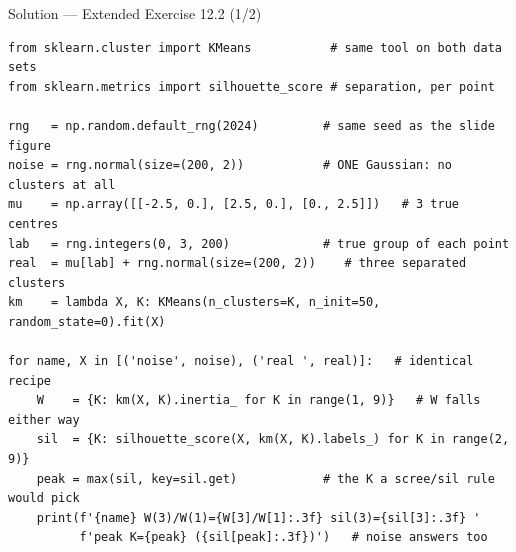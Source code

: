 \documentclass[aspectratio=169,11pt]{beamer}
\begin{document}
\begin{frame}[fragile]{Solution --- Extended Exercise 12.2 (1/2)}
\begin{solutionbox}
\begin{lstlisting}[basicstyle=\ttfamily\scriptsize]
from sklearn.cluster import KMeans           # same tool on both data sets
from sklearn.metrics import silhouette_score # separation, per point

rng   = np.random.default_rng(2024)         # same seed as the slide figure
noise = rng.normal(size=(200, 2))           # ONE Gaussian: no clusters at all
mu    = np.array([[-2.5, 0.], [2.5, 0.], [0., 2.5]])   # 3 true centres
lab   = rng.integers(0, 3, 200)             # true group of each point
real  = mu[lab] + rng.normal(size=(200, 2))    # three separated clusters
km    = lambda X, K: KMeans(n_clusters=K, n_init=50, random_state=0).fit(X)

for name, X in [('noise', noise), ('real ', real)]:   # identical recipe
    W    = {K: km(X, K).inertia_ for K in range(1, 9)}   # W falls either way
    sil  = {K: silhouette_score(X, km(X, K).labels_) for K in range(2, 9)}
    peak = max(sil, key=sil.get)            # the K a scree/sil rule would pick
    print(f'{name} W(3)/W(1)={W[3]/W[1]:.3f} sil(3)={sil[3]:.3f} '
          f'peak K={peak} ({sil[peak]:.3f})')   # noise answers too
\end{lstlisting}
\end{solutionbox}
\end{frame}
\end{document}
